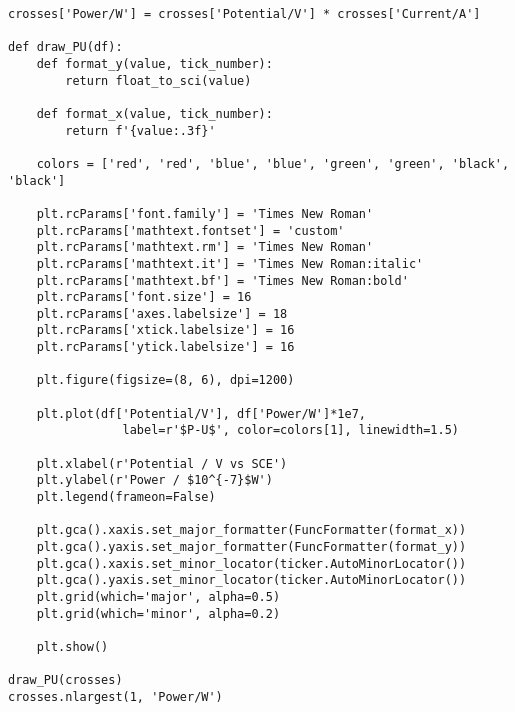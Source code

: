 \begin{verbatim}
crosses['Power/W'] = crosses['Potential/V'] * crosses['Current/A']

def draw_PU(df):
    def format_y(value, tick_number):
        return float_to_sci(value)

    def format_x(value, tick_number):
        return f'{value:.3f}'

    colors = ['red', 'red', 'blue', 'blue', 'green', 'green', 'black', 'black']

    plt.rcParams['font.family'] = 'Times New Roman'
    plt.rcParams['mathtext.fontset'] = 'custom'
    plt.rcParams['mathtext.rm'] = 'Times New Roman'
    plt.rcParams['mathtext.it'] = 'Times New Roman:italic'
    plt.rcParams['mathtext.bf'] = 'Times New Roman:bold'
    plt.rcParams['font.size'] = 16
    plt.rcParams['axes.labelsize'] = 18
    plt.rcParams['xtick.labelsize'] = 16
    plt.rcParams['ytick.labelsize'] = 16

    plt.figure(figsize=(8, 6), dpi=1200)

    plt.plot(df['Potential/V'], df['Power/W']*1e7,
                label=r'$P-U$', color=colors[1], linewidth=1.5)
    
    plt.xlabel(r'Potential / V vs SCE')
    plt.ylabel(r'Power / $10^{-7}$W')
    plt.legend(frameon=False)
    
    plt.gca().xaxis.set_major_formatter(FuncFormatter(format_x))
    plt.gca().yaxis.set_major_formatter(FuncFormatter(format_y))
    plt.gca().xaxis.set_minor_locator(ticker.AutoMinorLocator())
    plt.gca().yaxis.set_minor_locator(ticker.AutoMinorLocator())
    plt.grid(which='major', alpha=0.5)
    plt.grid(which='minor', alpha=0.2)

    plt.show()

draw_PU(crosses)
crosses.nlargest(1, 'Power/W')
\end{verbatim}
